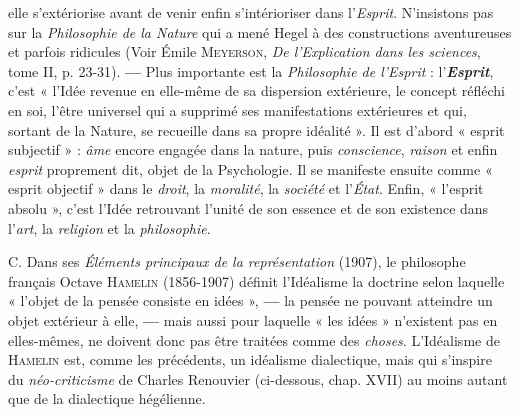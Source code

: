 elle s’extériorise avant de venir enfin s’intérioriser dans l’{\it Esprit}.
N’insistons pas sur la {\it Philosophie de la Nature} qui a mené Hegel à
des constructions aventureuses et parfois ridicules {\scriptsize (Voir Émile \textsc{Meyerson}, {\it De l'Explication dans les sciences}, tome II, p. 23-31)}. {\bf —} Plus importante
est la {\it Philosophie de l'Esprit} : l'\textbf{\textit {Esprit}}, c’est « l’Idée revenue en
elle-même de sa dispersion extérieure, le concept réfléchi en soi,
l'être universel qui a supprimé ses manifestations extérieures et qui,
sortant de la Nature, se recueille dans sa propre idéalité ». Il est
d’abord « esprit subjectif » : {\it âme} encore engagée dans la nature, puis
{\it conscience}, {\it raison} et enfin {\it esprit} proprement dit, objet de la Psychologie.
Il se manifeste ensuite comme « esprit objectif » dans le {\it droit},
la {\it moralité}, la {\it société} et l’{\it État}. Enfin, « l'esprit absolu », c’est l’Idée
retrouvant l'unité de son essence et de son existence dans l’{\it art}, la
{\it religion} et la {\it philosophie}.

C. Dans ses {\it Éléments principaux de la représentation} (1907), le
philosophe français Octave \textsc{Hamelin} (1856-1907) définit l’Idéalisme
la doctrine selon laquelle « l’objet de la pensée consiste en idées », {\bf —}
la pensée ne pouvant atteindre un objet extérieur à elle, {\bf —} mais aussi
pour laquelle « les idées » n’existent pas en elles-mêmes, ne doivent
donc pas être traitées comme des {\it choses}. L’Idéalisme de \textsc{Hamelin} est,
comme les précédents, un idéalisme dialectique, mais qui s’inspire
du {\it néo-criticisme} de Charles Renouvier (ci-dessous, chap. XVII) au
moins autant que de la dialectique hégélienne.


